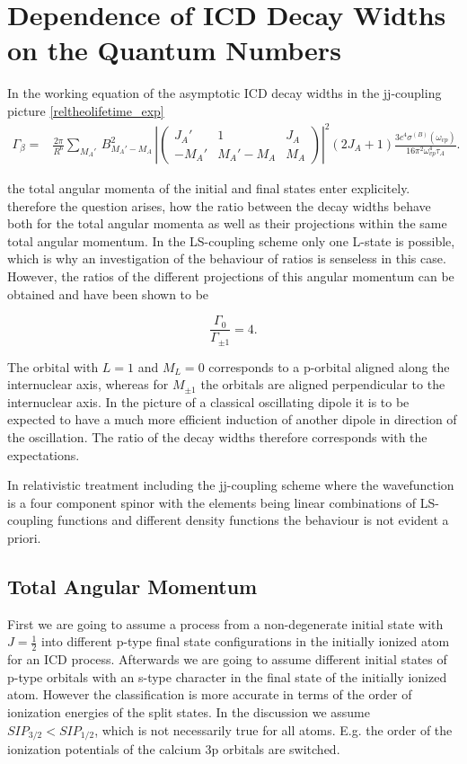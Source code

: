 \chapter{Dependence of \ac{ICD} Decay Widths on the Quantum Numbers}

In the working equation of the asymptotic \ac{ICD} decay widths in the jj-coupling
picture \ref{reltheolifetime_exp}
\begin{align}
 \Gamma_\beta =& \frac{2\pi}{R^6} \sum\limits_{M_A'} \, B_{M_A'-M_A}^2 \, \left| \left(
\begin{array}{ccc}
J_A'  & 1        & J_A\\
-M_A' & M_A'-M_A & M_A
\end{array}\right) \right|^2
 (2J_A+1)\frac{3c^4 \sigma^{(B)}(\omega_{vp})}{16\pi^2\omega_{vp}^4\tau_A} .
\end{align}

the total angular momenta of the initial and final states enter explicitely.
therefore the question arises, how the ratio between the decay widths behave
both for the total angular momenta as well as their projections within the
same total angular momentum. In the LS-coupling scheme only one L-state is possible,
which is why an investigation of the behaviour of ratios is senseless in this
case. However, the ratios of the different projections of this angular momentum
can be obtained and have been shown to be \cite{Gokhberg10_1}

\begin{equation}
  \frac{\Gamma_0}{\Gamma_{\pm 1}} = 4  .
\end{equation}

The orbital with $L=1$ and $M_L=0$ corresponds to a p-orbital aligned along
the internuclear axis, whereas for $M_{\pm 1}$ the orbitals are aligned perpendicular
to the internuclear axis. In the picture of a classical oscillating dipole it is
to be expected to have a much more efficient induction of another dipole
in direction of the oscillation. The ratio of the decay widths therefore
corresponds with the expectations.

In relativistic treatment including the jj-coupling scheme where the wavefunction
is a four component spinor with the elements being linear combinations
of LS-coupling functions and different density functions the behaviour is
not evident a priori.

\section{Total Angular Momentum}
First we are going to assume a process
from a non-degenerate initial state with $J=\frac 12$ into different
p-type final state configurations
in the initially ionized atom for an \ac{ICD} process. Afterwards we are going
to assume different initial states of p-type orbitals with an s-type
character in the final state of the initially ionized atom.
However the classification is more accurate in terms of the order of
ionization energies of the split states. In the discussion we assume
$SIP_{3/2}<SIP_{1/2}$, which is not necessarily true for all atoms. E.g.
the order of the ionization potentials of the calcium 3p orbitals are
switched.

